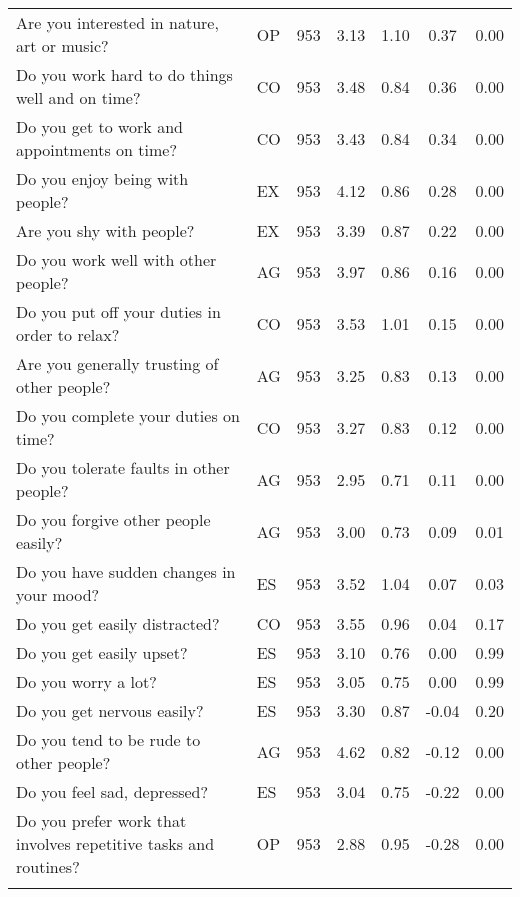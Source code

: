 \begin{table}[htbp]
{\begin{tabular}{llccccc}
    Are you interested in nature, art or music? & OP    & 953   & 3.13  & 1.10  & 0.37  & 0.00 \\
    Do you work hard to do things well and on time? & CO    & 953   & 3.48  & 0.84  & 0.36  & 0.00 \\
    Do you get to work and appointments on time? & CO    & 953   & 3.43  & 0.84  & 0.34  & 0.00 \\
    Do you enjoy being with people? & EX    & 953   & 4.12  & 0.86  & 0.28  & 0.00 \\
    Are you shy with people? & EX    & 953   & 3.39  & 0.87  & 0.22  & 0.00 \\
    Do you work well with other people? & AG    & 953   & 3.97  & 0.86  & 0.16  & 0.00 \\
    Do you put off your duties in order to relax? & CO    & 953   & 3.53  & 1.01  & 0.15  & 0.00 \\
    Are you generally trusting of other people? & AG    & 953   & 3.25  & 0.83  & 0.13  & 0.00 \\
    Do you complete your duties on time? & CO    & 953   & 3.27  & 0.83  & 0.12  & 0.00 \\
    Do you tolerate faults in other people? & AG    & 953   & 2.95  & 0.71  & 0.11  & 0.00 \\
    Do you forgive other people easily? & AG    & 953   & 3.00  & 0.73  & 0.09  & 0.01 \\
    Do you have sudden changes in your mood? & ES    & 953   & 3.52  & 1.04  & 0.07  & 0.03 \\
    Do you get easily distracted? & CO    & 953   & 3.55  & 0.96  & 0.04  & 0.17 \\
    Do you get easily upset? & ES    & 953   & 3.10  & 0.76  & 0.00  & 0.99 \\
    Do you worry a lot? & ES    & 953   & 3.05  & 0.75  & 0.00  & 0.99 \\
    Do you get nervous easily? & ES    & 953   & 3.30  & 0.87  & -0.04 & 0.20 \\
    Do you tend to be rude to other people? & AG    & 953   & 4.62  & 0.82  & -0.12 & 0.00 \\
    Do you feel sad, depressed? & ES    & 953   & 3.04  & 0.75  & -0.22 & 0.00 \\
    Do you prefer work that involves repetitive tasks and routines? & OP    & 953   & 2.88  & 0.95  & -0.28 & 0.00 \\
    \bottomrule
	\Tablenote{7}{Most contributive \textbf{variables} are used to interpret factor: threshold at 0.7.} \\
    \end{tabular}%
	}
  \label{tab:factor1}%
\end{table}%

